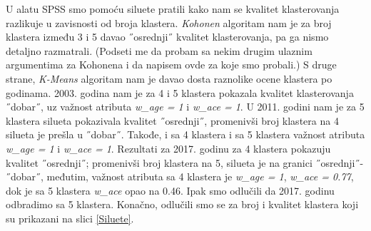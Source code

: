 \documentclass[a4paper]{article}
\begin{document}
U alatu SPSS smo pomoću siluete pratili kako nam se kvalitet klasterovanja razlikuje u zavisnosti od broja klastera. 
\textit{Kohonen} algoritam nam je za broj klastera između 3 i 5 davao ˝osrednji˝ kvalitet klasterovanja, pa ga nismo detaljno razmatrali. {\color{red} (Podseti me da probam sa nekim drugim ulaznim argumentima za Kohonena i da napisem ovde za koje smo probali.)} S druge strane, \textit{K-Means} algoritam nam je davao dosta raznolike ocene klastera po godinama. 2003. godina nam je za 4 i 5 klastera pokazala kvalitet klasterovanja  ˝dobar˝, uz važnost atributa \textit{w\_age = 1} i \textit{w\_ace = 1}. U 2011. godini nam je za 5 klastera silueta pokazivala kvalitet ˝osrednji˝, promenivši broj klastera na 4 silueta je prešla u ˝dobar˝. Takođe, i sa 4 klastera i sa 5 klastera važnost atributa \textit{w\_age = 1} i \textit{w\_ace = 1}. Rezultati za 2017. godinu za 4 klastera pokazuju kvalitet ˝osrednji˝; promenivši broj klastera na 5, silueta je na granici ˝osrednji˝-˝dobar˝, međutim, važnost atributa sa 4 klastera je \textit{w\_age = 1}, \textit{w\_ace = 0.77}, dok je sa 5 klastera \textit{w\_ace} opao na 0.46. Ipak smo odlučili da 2017. godinu odbradimo sa 5 klastera. Konačno, odlučili smo se za broj i kvalitet klastera koji su prikazani na slici \ref{Siluete}.
\end{document}
